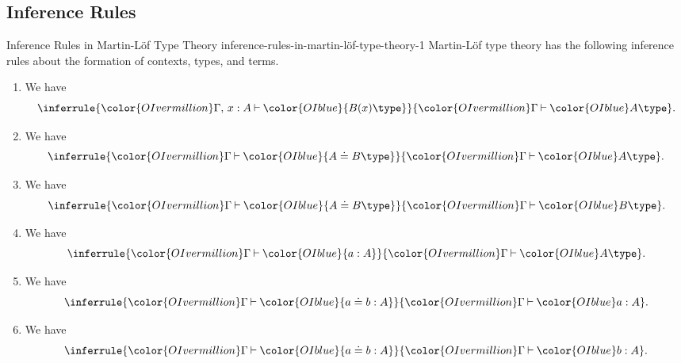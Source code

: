 \subsection{Inference Rules}\label{subsection-martin-löf-type-theory-inference-rules}
\begin{definition}{Inference Rules in Martin-Löf Type Theory \rmI}{inference-rules-in-martin-löf-type-theory-1}%
    Martin-Löf type theory has the following inference rules about the formation of contexts, types, and terms.
    \begin{enumerate}
        \item\label{inference-rules-in-martin-löf-type-theory-1-formation-of-dependent-types}We have
            \[
                \inferrule{{\color{OIvermillion}\Gamma,\,x:A}\mathbin{\vdash}{\color{OIblue}{B(x)\type}}}{{\color{OIvermillion}\Gamma}\mathbin{\vdash}{\color{OIblue}A\type}}.%
            \]%
        \item\label{inference-rules-in-martin-löf-type-theory-1-judgemental-equality-of-types-1}We have
            \[
                \inferrule{{\color{OIvermillion}\Gamma}\mathbin{\vdash}{\color{OIblue}{A\doteq B\type}}}{{\color{OIvermillion}\Gamma}\mathbin{\vdash}{\color{OIblue}A\type}}.%
            \]%
        \item\label{inference-rules-in-martin-löf-type-theory-1-judgemental-equality-of-types-2}We have
            \[
                \inferrule{{\color{OIvermillion}\Gamma}\mathbin{\vdash}{\color{OIblue}{A\doteq B\type}}}{{\color{OIvermillion}\Gamma}\mathbin{\vdash}{\color{OIblue}B\type}}.%
            \]%
        \item\label{inference-rules-in-martin-löf-type-theory-1-terms}We have
            \[
                \inferrule{{\color{OIvermillion}\Gamma}\mathbin{\vdash}{\color{OIblue}{a:A}}}{{\color{OIvermillion}\Gamma}\mathbin{\vdash}{\color{OIblue}A\type}}.%
            \]%
        \item\label{inference-rules-in-martin-löf-type-theory-1-judgemental-equality-of-terms-1}We have
            \[
                \inferrule{{\color{OIvermillion}\Gamma}\mathbin{\vdash}{\color{OIblue}{a\doteq b:A}}}{{\color{OIvermillion}\Gamma}\mathbin{\vdash}{\color{OIblue}a:A}}.%
            \]%
        \item\label{inference-rules-in-martin-löf-type-theory-1-judgemental-equality-of-terms-2}We have
            \[
                \inferrule{{\color{OIvermillion}\Gamma}\mathbin{\vdash}{\color{OIblue}{a\doteq b:A}}}{{\color{OIvermillion}\Gamma}\mathbin{\vdash}{\color{OIblue}b:A}}.%
            \]%
    \end{enumerate}
\end{definition}
